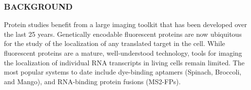 
\subsubsection*{BACKGROUND}
Protein studies benefit from a large imaging toolkit that has been developed over the last 25 years. Genetically encodable fluorescent proteins are now ubiquitous for the study of the localization of any translated target in the cell. While fluorescent proteins are a mature, well-understood technology, tools for imaging the localization of individual RNA transcripts in living cells remain limited. The most popular systems to date include dye-binding aptamers (Spinach\cite{PaigeRNAMimicsGreen2011}, Broccoli\cite{FilonovBroccoliRapidSelection2014}, and Mango\cite{AutourFluorogenicRNAMango2018,DolgosheinaRNAMangoAptamerFluorophore2014}), and RNA-binding protein fusions (MS2-FPs)\cite{FuscoSinglemRNAMolecules2003}.
